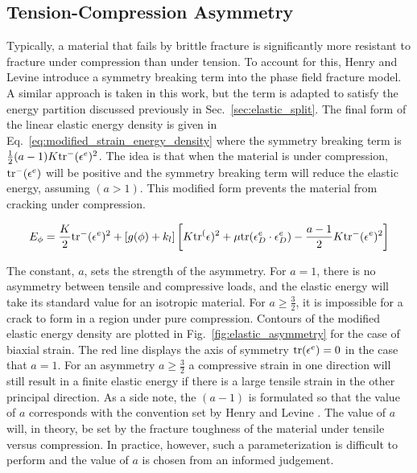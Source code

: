 \subsection{Tension-Compression Asymmetry}

Typically, a material that fails by brittle fracture is significantly more resistant to fracture under compression than under tension. To account for this, Henry and Levine \cite{Henry2004} introduce a symmetry breaking term into the phase field fracture model. A similar approach is taken in this work, but the term is adapted to satisfy the energy partition discussed previously in Sec.~\ref{sec:elastic_split}. The final form of the linear elastic energy density is given in Eq.~\ref{eq:modified_strain_energy_density} where the symmetry breaking term is $\tfrac{1}{2}(a-1)K\text{tr}^-(\epsilon^e)^2$. The idea is that when the material is under compression, $\text{tr}^-(\epsilon^e)$ will be positive and the symmetry breaking term will reduce the elastic energy, assuming $(a>1)$. This modified form prevents the material from cracking under compression.

\begin{align}\label{eq:modified_strain_energy_density}
	E_{\phi} = \frac{K}{2}\text{tr}^-(\epsilon^e)^2 + [g(\phi)+k_l] \left[K\text{tr}^(\epsilon)^2 + \mu\text{tr}(\epsilon_D^e\cdot\epsilon_D^e) - \frac{a-1}{2}K\text{tr}^-(\epsilon^e)^2\right]
\end{align}

The constant, $a$, sets the strength of the asymmetry. For $a=1$, there is no asymmetry between tensile and compressive loads, and the elastic energy will take its standard value for an isotropic material. For $a\ge \tfrac{3}{2}$, it is impossible for a crack to form in a region under pure compression. Contours of the modified elastic energy density are plotted in Fig.~\ref{fig:elastic_asymmetry} for the case of biaxial strain. The red line displays the axis of symmetry $\text{tr}(\epsilon^e)=0$ in the case that $a=1$. For an asymmetry $a\ge \tfrac{3}{2}$ a compressive strain in one direction will still result in a finite elastic energy if there is a large tensile strain in the other principal direction. As a side note, the $(a-1)$ is formulated so that the value of $a$ corresponds with the convention set by Henry and Levine \cite{Henry2004}. The value of $a$ will, in theory, be set by the fracture toughness of the material under tensile versus compression. In practice, however, such a parameterization is difficult to perform and the value of $a$ is chosen from an informed judgement. 

